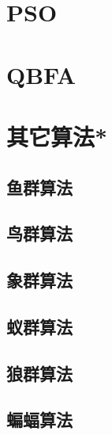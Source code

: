 \section{PSO}

\section{QBFA}
\section{其它算法*}
\subsection{鱼群算法}
\subsection{鸟群算法}
\subsection{象群算法}
\subsection{蚁群算法}
\subsection{狼群算法}
\subsection{蝙蝠算法}
